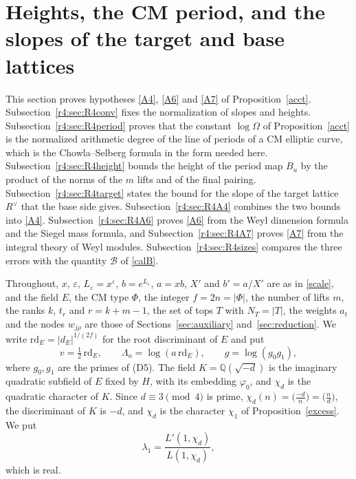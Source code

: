 

\section{Heights, the CM period, and the slopes of the target and base lattices}\label{r4:sec:R4}

This section proves hypotheses \eqref{A4}, \eqref{A6} and \eqref{A7} of Proposition~\ref{acct}. Subsection~\ref{r4:sec:R4conv} fixes the normalization of slopes and heights. Subsection~\ref{r4:sec:R4period} proves that the constant $\log\Omega$ of Proposition~\ref{acct} is the normalized arithmetic degree of the line of periods of a CM elliptic curve, which is the Chowla--Selberg formula in the form needed here. Subsection~\ref{r4:sec:R4height} bounds the height of the period map $B_u$ by the product of the norms of the $m$ lifts and of the final pairing. Subsection~\ref{r4:sec:R4target} states the bound for the slope of the target lattice $R^\vee$ that the base side gives. Subsection~\ref{r4:sec:R4A4} combines the two bounds into \eqref{A4}. Subsection~\ref{r4:sec:R4A6} proves \eqref{A6} from the Weyl dimension formula and the Siegel mass formula, and Subsection~\ref{r4:sec:R4A7} proves \eqref{A7} from the integral theory of Weyl modules. Subsection~\ref{r4:sec:R4sizes} compares the three errors with the quantity $\mathcal B$ of \eqref{calB}.

Throughout, $x$, $\varepsilon$, $L_\varepsilon=x^\varepsilon$, $b=e^{L_\varepsilon}$, $a=xb$, $X'$ and $b'=a/X'$ are as in \eqref{scale}, and the field $E$, the CM type $\Phi$, the integer $f=2n=\lvert\Phi\rvert$, the number of lifts $m$, the ranks $k$, $t_r$ and $r=k+m-1$, the set of tops $T$ with $N_T=\lvert T\rvert$, the weights $a_t$ and the nodes $w_{j\rho}$ are those of Sections~\ref{sec:auxiliary} and~\ref{sec:reduction}. We write $\mathrm{rd}_E=\lvert d_E\rvert^{1/(2f)}$ for the root discriminant of $E$ and put
\begin{equation}\label{r4:R4:v}
v=\tfrac12\,\mathrm{rd}_E,\qquad \Lambda_a=\log(a\,\mathrm{rd}_E),\qquad g=\log(g_0g_1),
\end{equation}
where $g_0,g_1$ are the primes of (D5). The field $K=\mathbb Q(\sqrt{-d})$ is the imaginary quadratic subfield of $E$ fixed by $H$, with its embedding $\varphi_0$, and $\chi_d$ is the quadratic character of $K$. Since $d\equiv3\pmod4$ is prime, $\chi_d(n)=\big(\frac{-d}n\big)=\big(\frac nd\big)$, the discriminant of $K$ is $-d$, and $\chi_d$ is the character $\chi_1$ of Proposition~\ref{excess}. We put
\[
\lambda_1=\frac{L'(1,\chi_d)}{L(1,\chi_d)},
\]
which is real.

